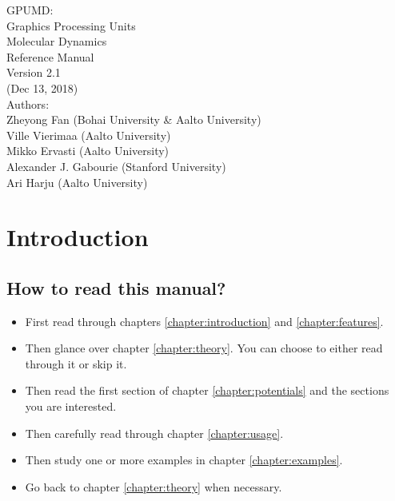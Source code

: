 \documentclass[12pt,a4paper]{report}
\begin{document}
\begin{center}
  \huge
  {
   \vspace*{1.0cm}
   GPUMD: \\
   Graphics Processing Units \\
   Molecular Dynamics\\
   \vspace*{1.0cm}
   Reference Manual\\
   \vspace*{1.0cm}
   Version 2.1\\
   \vspace*{1.0cm}
   (Dec 13, 2018)\\
  \vspace*{2.0cm}
  }
  \large
  {
  Authors: \\
  Zheyong Fan (Bohai University \& Aalto University)\\
  Ville Vierimaa (Aalto University)\\
  Mikko Ervasti (Aalto University)\\
  Alexander J. Gabourie (Stanford University)\\
  Ari Harju (Aalto University)\\
  }
  \vspace*{1.0cm}
\end{center}


\tableofcontents


\chapter{Introduction\label{chapter:introduction}}

\section{How to read this manual?}

\begin{itemize}
\item First read through chapters \ref{chapter:introduction} and \ref{chapter:features}.
\item Then glance over chapter \ref{chapter:theory}. You can choose to either read through it or skip it.
\item Then read the first section of chapter \ref{chapter:potentials} and the sections you are interested.
\item Then carefully read through chapter \ref{chapter:usage}.
\item Then study one or more examples in chapter \ref{chapter:examples}.
\item Go back to chapter \ref{chapter:theory} when necessary.
\end{itemize}
\end{document}
